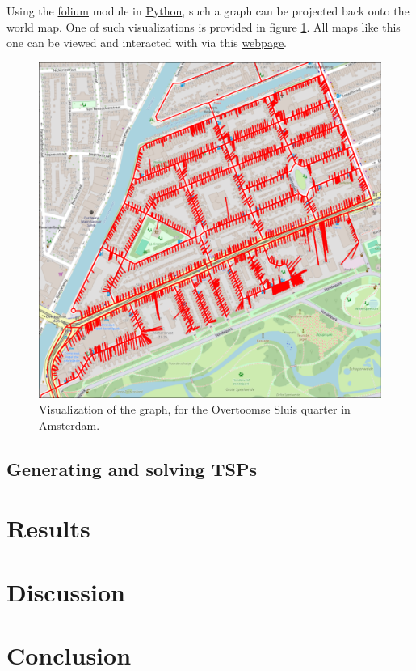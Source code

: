 \documentclass[12pt]{article}
\numberwithin{equation}{section}
\newcommand{\1}[1]{\,I_{#1}} %
\begin{document}
Using the \url{folium} module in \url{Python}, such a graph can be projected back onto the world map.
One of such visualizations is provided in figure \ref{fig:overtoomse_sluis}. All maps like this one
can be viewed and interacted with via this 
\href{https://koenstevens.nl/wp-content/uploads/maps/}{\url{webpage}}.
\begin{figure}[H]
  \caption{Visualization of the graph, for the Overtoomse Sluis quarter in Amsterdam.}
  \label{fig:overtoomse_sluis}
  \includegraphics[width=\textwidth]{Pictures/Overtoomse_Sluis_roads.png}
\end{figure}
\subsection{Generating and solving TSPs}
\section{Results}
\section{Discussion}
\section{Conclusion}


\end{document}
